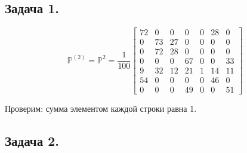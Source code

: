 \begin{figure}[H]
\end{figure}

\subsection*{Задача 1.}

\[
\mathbb{P}^{(2)} = \mathbb{P}^2 =
\frac{1}{100}
\begin{bmatrix}
	72 & 0  & 0  & 0  & 0 & 28 & 0  \\
	0  & 73 & 27 & 0  & 0 & 0  & 0  \\
	0  & 72 & 28 & 0  & 0 & 0  & 0  \\
	0  & 0  & 0  & 67 & 0 & 0  & 33 \\
	9  & 32 & 12 & 21 & 1 & 14 & 11 \\
	54 & 0  & 0  & 0  & 0 & 46 & 0  \\
	0  & 0  & 0  & 49 & 0 & 0  & 51
\end{bmatrix}
\]

Проверим: сумма элементом каждой строки равна 1.

\subsection*{Задача 2.}

